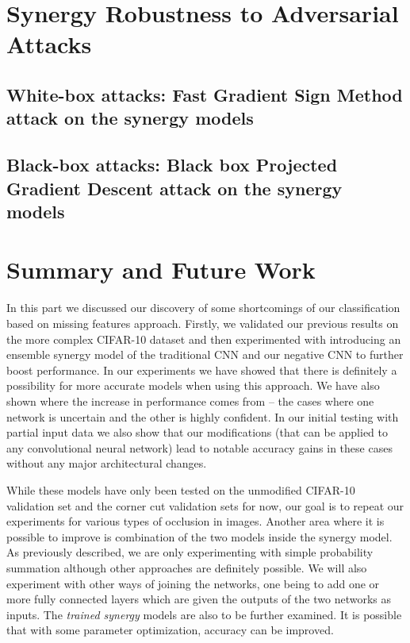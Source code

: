 \documentclass[b5paper]{book}
\begin{document}
\section{Synergy Robustness to Adversarial Attacks}

\subsection{White-box attacks: Fast Gradient Sign Method attack on the synergy models}
\subsection{Black-box attacks: Black box Projected Gradient Descent attack on the synergy models}

\section{Summary and Future Work}
\label{summary}

In this part we discussed our discovery of some shortcomings of our classification based on missing features approach. Firstly, we validated our previous results on the more complex CIFAR-10 dataset and then experimented with introducing an ensemble synergy model of the traditional CNN and our negative CNN to further boost performance. In our experiments we have showed that there is definitely a possibility for more accurate models when using this approach. We have also shown where the increase in performance comes from -- the cases where one network is uncertain and the other is highly confident. In our initial testing with partial input data we also show that our modifications (that can be applied to any convolutional neural network) lead to notable accuracy gains in these cases without any major architectural changes.

While these models have only been tested on the unmodified CIFAR-10 validation set and the corner cut validation sets for now, our goal is to repeat our experiments for various types of occlusion in images. Another area where it is possible to improve is combination of the two models inside the synergy model. As previously described, we are only experimenting with simple probability summation although other approaches are definitely possible. We will also experiment with other ways of joining the networks, one being to add one or more fully connected layers which are given the outputs of the two networks as inputs. The \emph{trained synergy} models are also to be further examined. It is possible that with some parameter optimization, accuracy can be improved.
\end{document}
